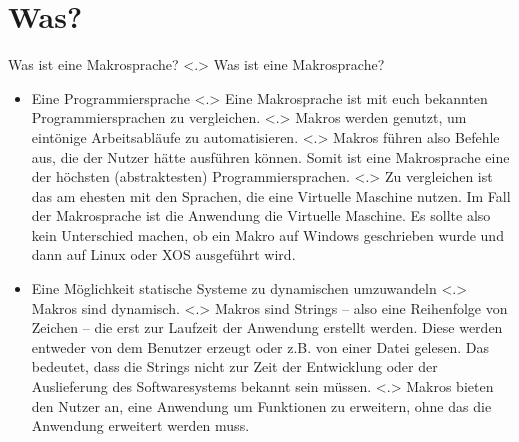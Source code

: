 \section{Was?}

  \begin{frame}{Was ist eine Makrosprache?}
    \pause
        \note[item]<.>{
          Was ist eine Makrosprache?
        }

    \begin{itemize}[<+- | alert@+>]
      \item
        Eine Programmiersprache
            \note[item]<.>{
              Eine Makrosprache ist mit euch bekannten Programmiersprachen zu vergleichen.
            }
            \note[item]<.>{
              Makros werden genutzt, um eintönige Arbeitsabläufe zu automatisieren.
            }
            \note[item]<.>{
              Makros führen also Befehle aus, die der Nutzer hätte ausführen können. Somit ist eine Makrosprache eine der höchsten (abstraktesten) Programmiersprachen.
            }
            \note[item]<.>{
              Zu vergleichen ist das am ehesten mit den Sprachen, die eine Virtuelle Maschine nutzen. Im Fall der Makrosprache ist die Anwendung die Virtuelle Maschine. Es sollte also kein Unterschied machen, ob ein Makro auf Windows geschrieben wurde und dann auf Linux oder XOS ausgeführt wird.
            }

      \item
        Eine Möglichkeit statische Systeme zu dynamischen umzuwandeln
            \note[item]<.>{
              Makros sind dynamisch.
            }
            \note[item]<.>{
              Makros sind Strings -- also eine Reihenfolge von Zeichen -- die erst zur Laufzeit der Anwendung erstellt werden. Diese werden entweder von dem Benutzer erzeugt oder z.B. von einer Datei gelesen. Das bedeutet, dass die Strings nicht zur Zeit der Entwicklung oder der Auslieferung des Softwaresystems bekannt sein müssen.
            }
            \note[item]<.>{
              Makros bieten den Nutzer an, eine Anwendung um Funktionen zu erweitern, ohne das die Anwendung erweitert werden muss.
            }


\end{itemize}
\end{frame}
